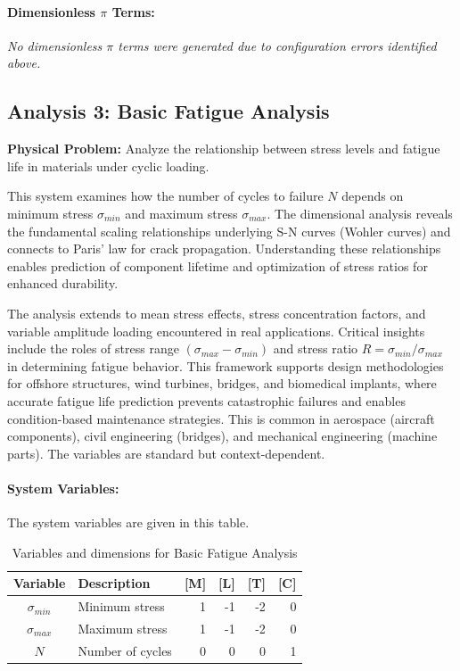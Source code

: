         \paragraph{Dimensionless $\pi$ Terms: }
        \textit{No dimensionless $\pi$ terms were generated due to configuration errors identified above.}


\subsection{Analysis 3: Basic Fatigue Analysis}
\label{sec:Basic_Fatigue_Analysis}

\begin{problembox}
\textbf{Physical Problem:} Analyze the relationship between stress levels and fatigue life in materials under cyclic loading.
\end{problembox}

This system examines how the number of cycles to failure $N$ depends on minimum stress $\sigma_{min}$ and maximum stress $\sigma_{max}$. The dimensional analysis reveals the fundamental scaling relationships underlying S-N curves (Wohler curves) and connects to Paris' law for crack propagation. Understanding these relationships enables prediction of component lifetime and optimization of stress ratios for enhanced durability.



The analysis extends to mean stress effects, stress concentration factors, and variable amplitude loading encountered in real applications. Critical insights include the roles of stress range $(\sigma_{max} - \sigma_{min})$ and stress ratio $R = \sigma_{min}/\sigma_{max}$ in determining fatigue behavior. This framework supports design methodologies for offshore structures, wind turbines, bridges, and biomedical implants, where accurate fatigue life prediction prevents catastrophic failures and enables condition-based maintenance strategies.  This is common in aerospace (aircraft components), civil engineering (bridges), and mechanical engineering (machine parts). The variables are standard but context-dependent.

\paragraph{System Variables: } The system variables are given in this table.

\begin{table}[H]
\centering
\begin{tabular}{|c|l|r|r|r|r|}
\hline
\textbf{Variable} & \textbf{Description} & \textbf{[M]} & \textbf{[L]} & \textbf{[T]} & \textbf{[C]} \\
\hline
$\sigma_{min}$ & Minimum stress & 1 & -1 & -2 & 0 \\
$\sigma_{max}$ & Maximum stress & 1 & -1 & -2 & 0 \\
$N$ & Number of cycles & 0 & 0 & 0 & 1 \\

\hline
\end{tabular}
\caption{Variables and dimensions for Basic Fatigue Analysis}
\end{table}

